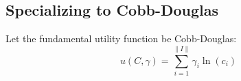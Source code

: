\documentclass{article}
\begin{document}
%
%
\subsection{Specializing to Cobb-Douglas}
Let the fundamental utility function be Cobb-Douglas:
\[u(C,\gamma) = \sum_{i=1}^{\|I\|} \gamma_i \ln(c_i)\]
\end{document}
